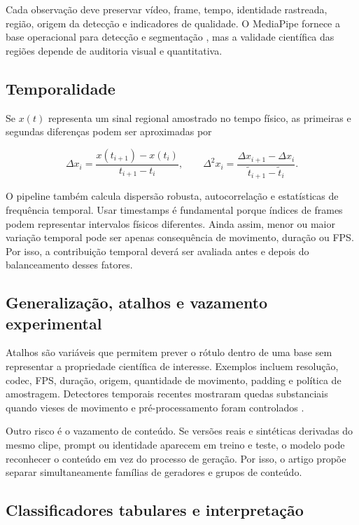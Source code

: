 \documentclass[11pt,a4paper]{article}
\begin{document}
Cada observação deve preservar vídeo, frame, tempo, identidade rastreada,
região, origem da detecção e indicadores de qualidade. O MediaPipe fornece a
base operacional para detecção e segmentação \cite{lugaresi2019mediapipe}, mas
a validade científica das regiões depende de auditoria visual e quantitativa.

\subsection{Temporalidade}

Se $x(t)$ representa um sinal regional amostrado no tempo físico, as primeiras
e segundas diferenças podem ser aproximadas por

\begin{equation}
  \Delta x_i = \frac{x(t_{i+1})-x(t_i)}{t_{i+1}-t_i},
  \qquad
  \Delta^2 x_i =
  \frac{\Delta x_{i+1}-\Delta x_i}{\widetilde{t}_{i+1}-\widetilde{t}_i}.
\end{equation}

O pipeline também calcula dispersão robusta, autocorrelação e estatísticas de
frequência temporal. Usar timestamps é fundamental porque índices de frames
podem representar intervalos físicos diferentes. Ainda assim, menor ou maior
variação temporal pode ser apenas consequência de movimento, duração ou FPS.
Por isso, a contribuição temporal deverá ser avaliada antes e depois do
balanceamento desses fatores.

\subsection{Generalização, atalhos e vazamento experimental}

Atalhos são variáveis que permitem prever o rótulo dentro de uma base sem
representar a propriedade científica de interesse. Exemplos incluem resolução,
codec, FPS, duração, origem, quantidade de movimento, padding e política de
amostragem. Detectores temporais recentes mostraram quedas substanciais quando
vieses de movimento e pré-processamento foram controlados
\cite{michels2026biases}.

Outro risco é o vazamento de conteúdo. Se versões reais e sintéticas derivadas
do mesmo clipe, prompt ou identidade aparecem em treino e teste, o modelo pode
reconhecer o conteúdo em vez do processo de geração. Por isso, o artigo propõe
separar simultaneamente famílias de geradores e grupos de conteúdo.

\subsection{Classificadores tabulares e interpretação}
\end{document}
